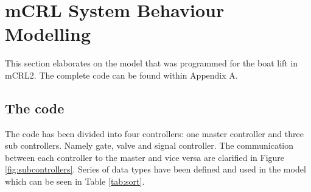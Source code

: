 \section{mCRL System Behaviour Modelling}
This section elaborates on the model that was programmed for the boat lift in mCRL2. The complete code can be found within Appendix A.
\subsection{The code}
The code has been divided into four controllers: one master controller and three sub controllers. Namely gate, valve and signal controller. The communication between each controller to the master and vice versa are clarified in Figure \ref{fig:subcontrollers}.
Series of data types have been defined and used in the model which can be seen in Table \ref{tab:sort}.

